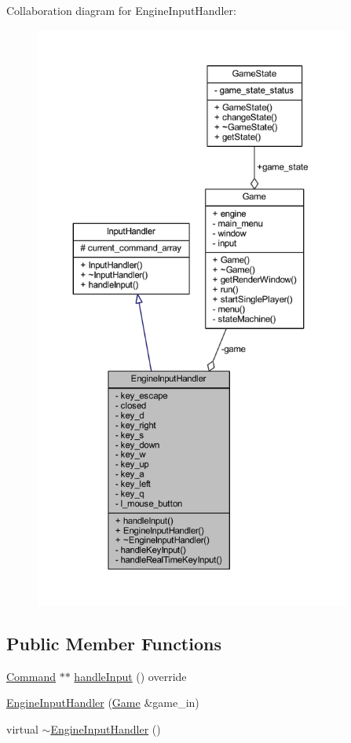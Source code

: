 Collaboration diagram for Engine\+Input\+Handler\+:
\nopagebreak
\begin{figure}[H]
\begin{center}
\leavevmode
\includegraphics[height=550pt]{class_engine_input_handler__coll__graph}
\end{center}
\end{figure}
\subsection*{Public Member Functions}
\begin{DoxyCompactItemize}
\item 
\hyperlink{class_command}{Command} $\ast$$\ast$ \hyperlink{class_engine_input_handler_ade92afaf7657007c2be3b5bd745c96e3}{handle\+Input} () override
\item 
\hyperlink{class_engine_input_handler_ac33be38a17d38deb390b879ceb2e1e2f}{Engine\+Input\+Handler} (\hyperlink{class_game}{Game} \&game\+\_\+in)
\item 
virtual \hyperlink{class_engine_input_handler_a92a875197705110bd6b2debfe7dbee6a}{$\sim$\+Engine\+Input\+Handler} ()
\end{DoxyCompactItemize}
